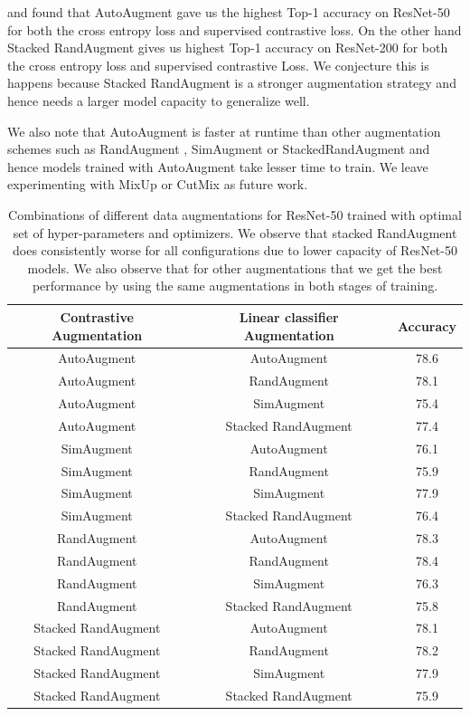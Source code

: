 and found that AutoAugment \cite{lim2019fast} gave us the highest Top-1 accuracy on ResNet-50 for both the cross entropy loss and supervised contrastive loss. On the other hand Stacked RandAugment \cite{tian2020makes} gives us highest Top-1 accuracy on ResNet-200 for both the cross entropy loss and supervised contrastive Loss. We conjecture this is happens because Stacked RandAugment is a stronger augmentation strategy and hence needs a larger model capacity to generalize well. 
 
We also note that AutoAugment is faster at runtime than other augmentation schemes such as RandAugment \cite{cubuk2019randaugment}, SimAugment \cite{chen2020simple} or StackedRandAugment \cite{tian2020makes} and hence models trained with AutoAugment take lesser time to train. We leave experimenting with MixUp \cite{zhang2017mixup} or CutMix \cite{yun2019cutmix} as future work. 



\begin{table}[ht]
    \centering
    \begin{tabular}{ccc}\toprule
        Contrastive Augmentation & Linear classifier Augmentation & Accuracy  \\\midrule
        AutoAugment & AutoAugment & 78.6 \\
        AutoAugment & RandAugment & 78.1 \\
        AutoAugment & SimAugment & 75.4 \\
        AutoAugment & Stacked RandAugment & 77.4 \\\midrule
        SimAugment & AutoAugment & 76.1 \\ 
        SimAugment & RandAugment & 75.9 \\
        SimAugment & SimAugment & 77.9 \\
        SimAugment & Stacked RandAugment & 76.4 \\\midrule
        RandAugment & AutoAugment & 78.3 \\ 
        RandAugment & RandAugment & 78.4 \\ 
        RandAugment & SimAugment & 76.3 \\
        RandAugment & Stacked RandAugment & 75.8 \\\midrule
        Stacked RandAugment & AutoAugment & 78.1 \\
        Stacked RandAugment & RandAugment & 78.2  \\
        Stacked RandAugment & SimAugment & 77.9 \\
        Stacked RandAugment & Stacked RandAugment & 75.9 \\ \bottomrule
    \end{tabular}
    \vspace{2mm}
    \caption{Combinations of different data augmentations for ResNet-50 trained with optimal set of hyper-parameters and optimizers. We observe that stacked RandAugment does consistently worse for all configurations due to lower capacity of ResNet-50 models. We also observe that for other augmentations that we get the best performance by using the same augmentations in both stages of training. }
    \label{tab:aug}
\end{table}


